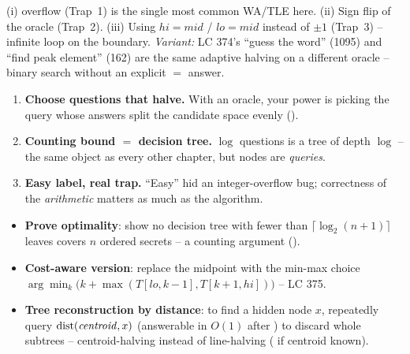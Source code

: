 
\begin{warningbox}
(i)  overflow (Trap~1) is the single most common WA/TLE here. (ii) Sign flip of the
oracle (Trap~2). (iii) Using $\mathit{hi}=\mathit{mid}$ / $\mathit{lo}=\mathit{mid}$ instead of
$\pm1$ (Trap~3) -- infinite loop on the boundary. \emph{Variant:} LC 374's ``guess the word'' (1095)
and ``find peak element'' (162) are the same adaptive halving on a different oracle -- binary search
without an explicit $=$ answer.
\end{warningbox}

\begin{insightbox}
\begin{enumerate}[nosep, leftmargin=1.6em]
  \item \textbf{Choose questions that halve.} With an oracle, your power is picking the query whose
        answers split the candidate space evenly ().
  \item \textbf{Counting bound $=$ decision tree.} $\log$ questions is a tree of depth $\log$ -- the
        same object as every other chapter, but nodes are \emph{queries}.
  \item \textbf{Easy label, real trap.} ``Easy'' hid an integer-overflow bug; correctness of the
        \emph{arithmetic} matters as much as the algorithm.
\end{enumerate}
\end{insightbox}

\begin{hardeningbox}
\begin{itemize}[nosep, leftmargin=1.4em]
  \item \textbf{Prove optimality}: show no decision tree with fewer than $\lceil\log_2(n{+}1)\rceil$
        leaves covers $n$ ordered secrets -- a counting argument ().
  \item \textbf{Cost-aware version}: replace the midpoint with the min-max choice
        $\arg\min_k\big(k+\max(T[\mathit{lo},k{-}1],T[k{+}1,\mathit{hi}])\big)$ -- LC 375.
  \item \textbf{Tree reconstruction by distance}: to find a hidden node $x$, repeatedly query
        $\operatorname{dist}(\mathit{centroid},x)$ (answerable in $O(1)$ after ) to discard whole
        subtrees -- centroid-halving instead of line-halving ( if centroid known).
\end{itemize}
\end{hardeningbox}

